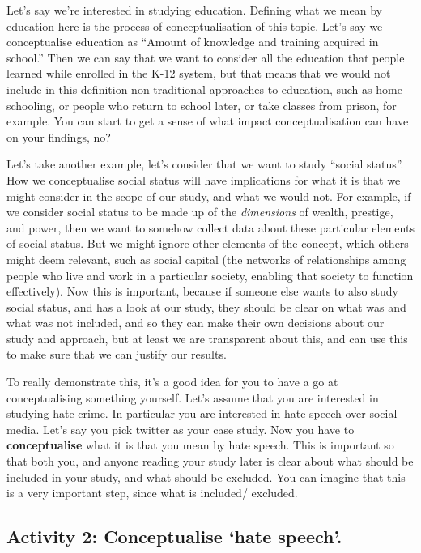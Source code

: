 \documentclass[]{book}
\theoremstyle{definition}
\theoremstyle{definition}
\theoremstyle{definition}
\theoremstyle{remark}
\begin{document}
Let's say we're interested in studying education. Defining what we mean
by education here is the process of conceptualisation of this topic.
Let's say we conceptualise education as ``Amount of knowledge and
training acquired in school.'' Then we can say that we want to consider
all the education that people learned while enrolled in the K-12 system,
but that means that we would not include in this definition
non-traditional approaches to education, such as home schooling, or
people who return to school later, or take classes from prison, for
example. You can start to get a sense of what impact conceptualisation
can have on your findings, no?

Let's take another example, let's consider that we want to study
``social status''. How we conceptualise social status will have
implications for what it is that we might consider in the scope of our
study, and what we would not. For example, if we consider social status
to be made up of the \emph{dimensions} of wealth, prestige, and power,
then we want to somehow collect data about these particular elements of
social status. But we might ignore other elements of the concept, which
others might deem relevant, such as social capital (the networks of
relationships among people who live and work in a particular society,
enabling that society to function effectively). Now this is important,
because if someone else wants to also study social status, and has a
look at our study, they should be clear on what was and what was not
included, and so they can make their own decisions about our study and
approach, but at least we are transparent about this, and can use this
to make sure that we can justify our results.

To really demonstrate this, it's a good idea for you to have a go at
conceptualising something yourself. Let's assume that you are interested
in studying hate crime. In particular you are interested in hate speech
over social media. Let's say you pick twitter as your case study. Now
you have to \textbf{conceptualise} what it is that you mean by hate
speech. This is important so that both you, and anyone reading your
study later is clear about what should be included in your study, and
what should be excluded. You can imagine that this is a very important
step, since what is included/ excluded.

\hypertarget{activity-2-conceptualise-hate-speech.}{%
\subsection{Activity 2: Conceptualise `hate
speech'.}\label{activity-2-conceptualise-hate-speech.}}
\end{document}
